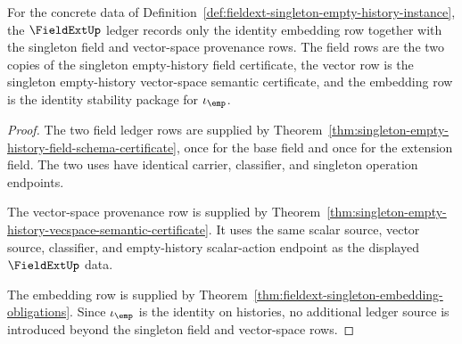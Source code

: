 \begin{theorem}
\label{thm:fieldext-singleton-ledger-provenance}
For the concrete data of
Definition~\ref{def:fieldext-singleton-empty-history-instance}, the
$\FieldExtUp$ ledger records only the identity embedding row together with
the singleton field and vector-space provenance rows. The field rows are the
two copies of the singleton empty-history field certificate, the vector row is
the singleton empty-history vector-space semantic certificate, and the
embedding row is the identity stability package for $\iota_{\emp}$.
\end{theorem}
\begin{proof}
The two field ledger rows are supplied by
Theorem~\ref{thm:singleton-empty-history-field-schema-certificate}, once for
the base field and once for the extension field. The two uses have identical
carrier, classifier, and singleton operation endpoints.

The vector-space provenance row is supplied by
Theorem~\ref{thm:singleton-empty-history-vecspace-semantic-certificate}. It
uses the same scalar source, vector source, classifier, and empty-history
scalar-action endpoint as the displayed $\FieldExtUp$ data.

The embedding row is supplied by
Theorem~\ref{thm:fieldext-singleton-embedding-obligations}. Since
$\iota_{\emp}$ is the identity on histories, no additional ledger source is
introduced beyond the singleton field and vector-space rows.
\end{proof}

